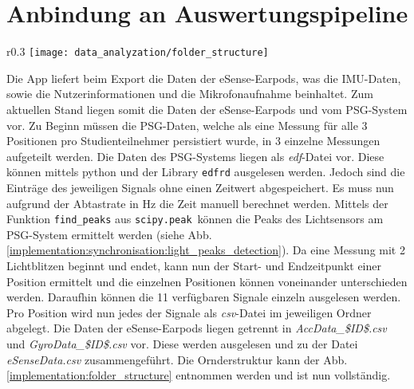 \section{Anbindung an Auswertungspipeline}
\label{ch:Implementierung:way_to_pipeline}
\begin{wrapfigure}{r}{0.3\textwidth}
  \centering
  \texttt{[image: data\_analyzation/folder\_structure]}
  \caption{Ornderstruktur des Datensatzes}
  \label{implementation:folder_structure}
\end{wrapfigure}
Die App liefert beim Export die Daten der eSense-Earpods, was die IMU-Daten, sowie die Nutzerinformationen und die Mikrofonaufnahme beinhaltet.
Zum aktuellen Stand liegen somit die Daten der eSense-Earpods und vom PSG-System vor. 
Zu Beginn müssen die PSG-Daten, welche als eine Messung für alle 3 Positionen pro Studienteilnehmer persistiert wurde, in 3 einzelne Messungen aufgeteilt werden.
Die Daten des PSG-Systems liegen als \textit{edf}-Datei vor. 
Diese können mittels python und der Library \texttt{edfrd} ausgelesen werden.
Jedoch sind die Einträge des jeweiligen Signals ohne einen Zeitwert abgespeichert. 
Es muss nun aufgrund der Abtastrate in $\si{\hertz}$ die Zeit manuell berechnet werden. 
Mittels der Funktion \texttt{find\_peaks} aus \texttt{scipy.peak}\ können die Peaks des Lichtsensors am PSG-System ermittelt werden (siehe Abb. \ref{implementation:synchronisation:light_peaks_detection}).
Da eine Messung mit 2 Lichtblitzen beginnt und endet, kann nun der Start- und Endzeitpunkt einer Position ermittelt und die einzelnen Positionen können voneinander unterschieden werden. 
Daraufhin können die 11 verfügbaren Signale einzeln ausgelesen werden.
Pro Position wird nun jedes der Signale als \textit{csv}-Datei im jeweiligen Ordner abgelegt.
Die Daten der eSense-Earpods liegen getrennt in \textit{AccData\_\$ID\$.csv} und \textit{GyroData\_\$ID\$.csv} vor. 
Diese werden ausgelesen und zu der Datei \textit{eSenseData.csv} zusammengeführt.
Die Ornderstruktur kann der Abb. \ref{implementation:folder_structure} entnommen werden und ist nun vollständig.

